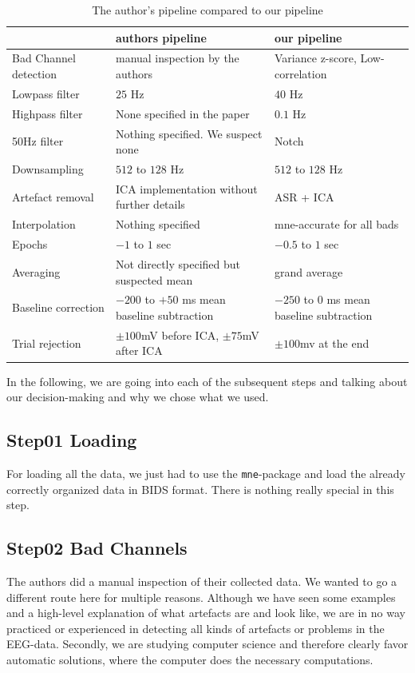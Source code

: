 \documentclass{scrartcl}
\begin{document}
\begin{table}[h]
    \hspace*{-1.8cm}\begin{tabular}{|l|l|l|}
        \hline
         & authors pipeline & our pipeline \\
        \hline
        Bad Channel detection & manual inspection by the authors & Variance z-score, Low-correlation \\
        Lowpass filter & $25$ Hz & $40$ Hz \\
        Highpass filter & None specified in the paper & $0.1$ Hz \\
        50Hz filter & Nothing specified. We suspect none & Notch \\
        Downsampling & $512$ to $128$ Hz & $512$ to $128$ Hz \\
        Artefact removal & ICA implementation without further details & ASR + ICA \\
        Interpolation & Nothing specified & mne-accurate for all bads \\
        Epochs & $-1$ to $1$ sec & $-0.5$ to $1$ sec \\
        Averaging & Not directly specified but suspected mean & grand average \\
        Baseline correction & $-200$ to $+50$ ms mean baseline subtraction & $-250$ to $0$ ms mean baseline subtraction \\
        Trial rejection & $\pm 100$mV before ICA, $\pm 75$mV after ICA & $\pm 100$mv at the end \\
        \hline
    \end{tabular}
    \caption{The author's pipeline compared to our pipeline}
    \label{tab:pipeline}
\end{table}

In the following, we are going into each of the subsequent steps and talking about our decision-making and why we chose what we used.

\subsection{Step01 Loading}
For loading all the data, we just had to use the \texttt{mne}-package and load the already correctly organized data in BIDS format.
There is nothing really special in this step.

\subsection{Step02 Bad Channels}
The authors did a manual inspection of their collected data.
We wanted to go a different route here for multiple reasons.
Although we have seen some examples and a high-level explanation of what artefacts are and look like, we are in no way practiced or experienced in detecting all kinds of artefacts or problems in the EEG-data.
Secondly, we are studying computer science and therefore clearly favor automatic solutions, where the computer does the necessary computations.
\end{document}
